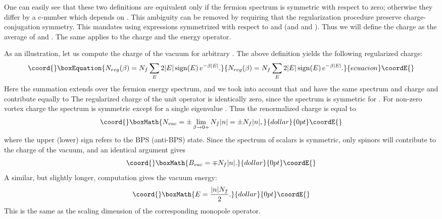 \documentclass[a4paper,12pt, amsfonts, amssymb]{article}
\providecommand{\ra}{\rightarrow}
\providecommand{\tpsi}{{\tilde \psi}}
\providecommand{\bpsi}{{\bar \psi}}
\begin{document}
One can easily 
see that these two definitions are equivalent only if the fermion spectrum
is symmetric with respect to zero; otherwise they differ by a c-number
which depends on \coordHE{}. This ambiguity can be removed by requiring that
the regularization procedure preserve charge-conjugation symmetry. 
This mandates using expressions symmetrized with respect to \myHighlight{$\psi$}\coordHE{} and \myHighlight{$\bpsi$}\coordHE{}
(and \myHighlight{$\tpsi$}\coordHE{} and \myHighlight{$\bar{\tpsi}$}\coordHE{}).
Thus we will define the \coordHE{} charge as the average of \coordHE{} and
\coordHE{}. The same applies to the \coordHE{} charge and the energy operator. 

As an illustration, let us compute the \coordHE{} charge of the vacuum for
arbitrary \coordHE{}.
The above definition yields the following regularized \coordHE{} charge:
\begin{equation}\coord{}\boxEquation{\label{Nreg}
N_{reg}(\beta)=N_f \sum_{E} 2|E|\, {\rm sign}(E)\, e^{-\beta \vert E\vert}.
}{N_{reg}(\beta)=N_f \sum_{E} 2|E|\, {\rm sign}(E)\, e^{-\beta \vert E\vert}.
}{ecuacion}\coordE{}\end{equation}
Here the summation extends over the fermion energy spectrum, and
we took into account that \myHighlight{$\psi$}\coordHE{} and \myHighlight{$\tpsi$}\coordHE{} have the same spectrum and
\coordHE{} charge and contribute equally to \coordHE{}
The regularized charge of the unit operator is identically zero,
since the spectrum is symmetric for \coordHE{}. For non-zero vortex charge the spectrum is symmetric except for a single eigenvalue \coordHE{}. 
Thus the renormalized charge is equal to 
$$\coord{}\boxMath{
N_{vac}=\pm \lim_{\beta\ra 0+} N_f |n|=\pm N_f|n|,
}{dollar}{0pt}\coordE{}$$
where the upper (lower) sign refers to the BPS (anti-BPS) state.
Since the spectrum of scalars is symmetric, only spinors will contribute
to the \coordHE{} charge of the vacuum, and an identical argument gives
$$\coord{}\boxMath{
B_{vac}=\mp N_f|n|.
}{dollar}{0pt}\coordE{}$$
A similar, but slightly longer, computation gives the vacuum energy:
$$\coord{}\boxMath{
E=\frac{|n|N_f}{2}.
}{dollar}{0pt}\coordE{}$$
This is the same as the scaling dimension of the corresponding monopole
operator.
\end{document}
